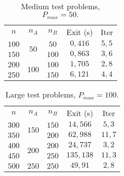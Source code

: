 \documentclass[opre,nonblindrev]{informs3} %
\begin{document}
\begin{table}[h]\scriptsize
	\begin{center}
		\begin{tabular}{|| c |c | c|| c||c ||}\hline
			
			\multirow{3}{*}{$n$} & \multirow{3}{*}{$n_A$} & \multirow{3}{*}{$n_B$} & \multirow{3}{*}{Exit (s)} & \multirow{3}{*}{Iter}\\
			&  &&  & \\
			&    &    &  &\\\hline
			$100$	 & \multirow{2}{*}{$50$}   & $50$   & $0,416$
			&$5,5$
			\\
			$150$  &  & $100$	 &$0,863$
			&$3,6$
			\\ \hline
			
			$200$	 & \multirow{2}{*}{$100$}   & $100$   & $1,705$
			&$2,8$
			\\
			$250$  &  & $150$	 & $6,121$
			&$4,4$
			\\ \hline
			
		\end{tabular}
	\end{center}
	\caption{Medium test problems, $P_{max}= 50.$} \label{mediumBid}
\end{table}


\begin{table}[h]\scriptsize
	\begin{center}
		\begin{tabular}{|| c |c | c|| c||c ||}\hline
			
			\multirow{3}{*}{$n$} & \multirow{3}{*}{$n_A$} & \multirow{3}{*}{$n_B$} & \multirow{3}{*}{Exit (s)} & \multirow{3}{*}{Iter}\\
			&  &&  & \\
			&    &    & &\\\hline
			$300$	 & \multirow{2}{*}{$150$}   & $150$   &$14,566$
			& $5,3$
			\\
			$350$  &  & $200$	 &$ 62,988$
			&$11,7$
			\\ \hline
			
			$400$	 & \multirow{2}{*}{$200$}   & $200$   &$ 24,737$
			&$3,2$
			\\
			$450$  &  & $250$	 &$135,138$
			&$11,3$
			\\ \hline
			
			$500$	 & $250$   & $250$   &  $49,91$
			&$2,8$
			\\ \hline
			
		\end{tabular}
	\end{center}
	\caption{Large test problems, $P_{max}= 100.$} \label{largeBid}
\end{table}
\end{document}
